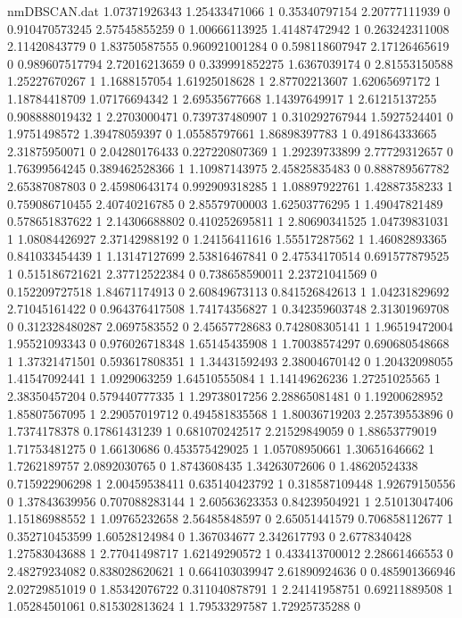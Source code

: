 \begin{filecontents}{nmDBSCAN.dat}
1.07371926343 1.25433471066 1
0.35340797154 2.20777111939 0
0.910470573245 2.57545855259 0
1.00666113925 1.41487472942 1
0.263242311008 2.11420843779 0
1.83750587555 0.960921001284 0
0.598118607947 2.17126465619 0
0.989607517794 2.72016213659 0
0.339991852275 1.6367039174 0
2.81553150588 1.25227670267 1
1.1688157054 1.61925018628 1
2.87702213607 1.62065697172 1
1.18784418709 1.07176694342 1
2.69535677668 1.14397649917 1
2.61215137255 0.908888019432 1
2.2703000471 0.739737480907 1
0.310292767944 1.5927524401 0
1.9751498572 1.39478059397 0
1.05585797661 1.86898397783 1
0.491864333665 2.31875950071 0
2.04280176433 0.227220807369 1
1.29239733899 2.77729312657 0
1.76399564245 0.389462528366 1
1.10987143975 2.45825835483 0
0.888789567782 2.65387087803 0
2.45980643174 0.992909318285 1
1.08897922761 1.42887358233 1
0.759086710455 2.40740216785 0
2.85579700003 1.62503776295 1
1.49047821489 0.578651837622 1
2.14306688802 0.410252695811 1
2.80690341525 1.04739831031 1
1.08084426927 2.37142988192 0
1.24156411616 1.55517287562 1
1.46082893365 0.841033454439 1
1.13147127699 2.53816467841 0
2.47534170514 0.691577879525 1
0.515186721621 2.37712522384 0
0.738658590011 2.23721041569 0
0.152209727518 1.84671174913 0
2.60849673113 0.841526842613 1
1.04231829692 2.71045161422 0
0.964376417508 1.74174356827 1
0.342359603748 2.31301969708 0
0.312328480287 2.0697583552 0
2.45657728683 0.742808305141 1
1.96519472004 1.95521093343 0
0.976026718348 1.65145435908 1
1.70038574297 0.690680548668 1
1.37321471501 0.593617808351 1
1.34431592493 2.38004670142 0
1.20432098055 1.41547092441 1
1.0929063259 1.64510555084 1
1.14149626236 1.27251025565 1
2.38350457204 0.579440777335 1
1.29738017256 2.28865081481 0
1.19200628952 1.85807567095 1
2.29057019712 0.494581835568 1
1.80036719203 2.25739553896 0
1.7374178378 0.17861431239 1
0.681070242517 2.21529849059 0
1.88653779019 1.71753481275 0
1.66130686 0.453575429025 1
1.05708950661 1.30651646662 1
1.7262189757 2.0892030765 0
1.8743608435 1.34263072606 0
1.48620524338 0.715922906298 1
2.00459538411 0.635140423792 1
0.318587109448 1.92679150556 0
1.37843639956 0.707088283144 1
2.60563623353 0.84239504921 1
2.51013047406 1.15186988552 1
1.09765232658 2.56485848597 0
2.65051441579 0.706858112677 1
0.352710453599 1.60528124984 0
1.367034677 2.342617793 0
2.6778340428 1.27583043688 1
2.77041498717 1.62149290572 1
0.433413700012 2.28661466553 0
2.48279234082 0.838028620621 1
0.664103039947 2.61890924636 0
0.485901366946 2.02729851019 0
1.85342076722 0.311040878791 1
2.24141958751 0.69211889508 1
1.05284501061 0.815302813624 1
1.79533297587 1.72925735288 0

\end{filecontents}
